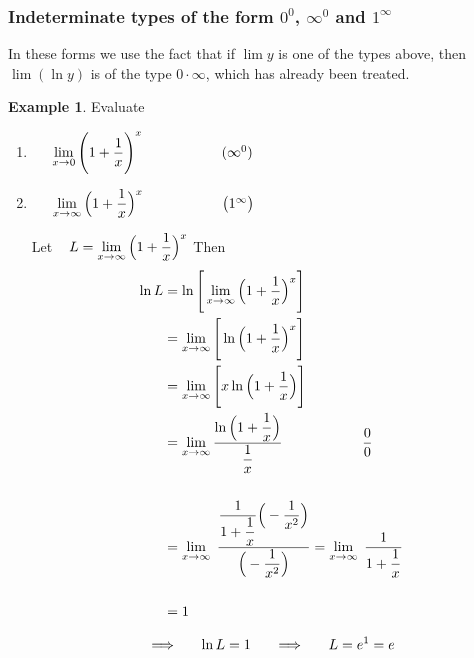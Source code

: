 \documentclass[11pt,a4paper]{article}
\theoremstyle{definition}
\newtheorem{exa}[thm]{Example}
\begin{document}
\subsubsection{Indeterminate types of the form $0^0$, $\infty^0$ and $1^{\infty}$}
In these forms we use the fact that if $\lim y$ is one of the types above,
then $\lim (\ln y)$ is of the type $0\cdot \infty$, which has already been
treated.


\begin{exa}
Evaluate
\begin{enumerate}
\item $\hspace{0.5cm}  \lim\limits_{x\rightarrow 0} \Bigg(1 + \dfrac{1}{x}\Bigg)^x\hspace{2cm} (\infty^0)$
\item $\hspace{0.5cm}  \lim\limits_{x\rightarrow \infty} \Big(1 + \dfrac{1}{x}\Big)^x\hspace{2cm} \big(1^{\infty}\big)$

Let $\hspace{0.3cm} L = \lim\limits_{x\rightarrow \infty} \Big(1 + \dfrac{1}{x}\Big)^x$ Then
\begin{align*}
\ln L & = \ln \Bigg[\lim\limits_{x\rightarrow \infty} \Big(1 + \dfrac{1}{x}\Big)^x\Bigg]\\
& = \lim\limits_{x\rightarrow \infty}\Bigg[\ln \Big(1 + \dfrac{1}{x}\Big)^x\Bigg]\\
& = \lim\limits_{x\rightarrow \infty}\Bigg[x \ln \Big(1 + \dfrac{1}{x}\Big)\Bigg]\\
& = \lim\limits_{x\rightarrow \infty}\dfrac{\ln\Big( 1 + \dfrac{1}{x}\Big)}{\dfrac{1}{x}}\hspace{2cm} \dfrac{0}{0}\\\\
& = \lim\limits_{x\rightarrow \infty}\hspace{0.1cm} \frac{\dfrac{1}{1 + \dfrac{1}{x}}\Big(-\dfrac{1}{x^2}\Big)}{\Big(-\dfrac{1}{x^2}\Big)}=\lim\limits_{x\rightarrow \infty}\hspace{0.1cm} \dfrac{1}{1 + \dfrac{1}{x}}\\\\
& = 1\\
\end{align*}

$$\implies\hspace{0.5cm} \ln L = 1 \hspace{0.5cm} \implies\hspace{0.5cm} L = e^1 = e$$
\end{enumerate}
\end{exa}
\end{document}
